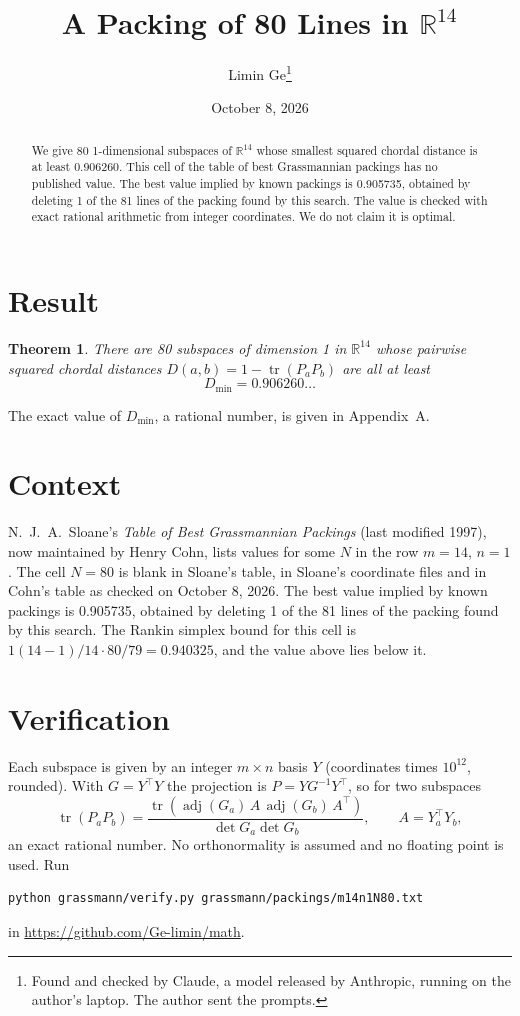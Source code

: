 \documentclass[11pt,a4paper]{article}
\title{A Packing of 80 Lines in $\mathbb{R}^{14}$}
\author{Limin Ge\thanks{Found and checked by Claude, a model released by Anthropic, running on the author's laptop. The author sent the prompts.}}
\date{October 8, 2026}
\newtheorem*{theorem}{Theorem}
\begin{document}
\maketitle
\begin{abstract}
We give 80 1-dimensional subspaces of $\mathbb{R}^{14}$ whose smallest squared chordal distance is at least 0.906260. This cell of the table of best Grassmannian packings has no published value. The best value implied by known packings is 0.905735, obtained by deleting 1 of the 81 lines of the packing found by this search. The value is checked with exact rational arithmetic from integer coordinates. We do not claim it is optimal.
\end{abstract}

\section{Result}
\begin{theorem}
There are 80 subspaces of dimension 1 in $\mathbb{R}^{14}$ whose pairwise squared chordal distances $D(a,b) = 1 - \operatorname{tr}(P_aP_b)$ are all at least
\[ D_{\min} = 0.906260\ldots \]
\end{theorem}
The exact value of $D_{\min}$, a rational number, is given in Appendix~A.


\section{Context}
N.~J.~A.~Sloane's \emph{Table of Best Grassmannian Packings} (last modified 1997), now maintained by Henry Cohn, lists values for some $N$ in the row $m=14$, $n=1$. The cell $N=80$ is blank in Sloane's table, in Sloane's coordinate files and in Cohn's table as checked on October 8, 2026. The best value implied by known packings is 0.905735, obtained by deleting 1 of the 81 lines of the packing found by this search. The Rankin simplex bound for this cell is $1(14-1)/14\cdot 80/79 = 0.940325$, and the value above lies below it.


\section{Verification}
Each subspace is given by an integer $m\times n$ basis $Y$ (coordinates times $10^{12}$, rounded). With $G=Y^\top Y$ the projection is $P=YG^{-1}Y^\top$, so for two subspaces
\[ \operatorname{tr}(P_aP_b)=\frac{\operatorname{tr}(\operatorname{adj}(G_a)\,A\,\operatorname{adj}(G_b)\,A^\top)}{\det G_a\det G_b},\qquad A=Y_a^\top Y_b, \]
an exact rational number. No orthonormality is assumed and no floating point is used. Run
\begin{verbatim}
python grassmann/verify.py grassmann/packings/m14n1N80.txt
\end{verbatim}
in \url{https://github.com/Ge-limin/math}.
\end{document}
